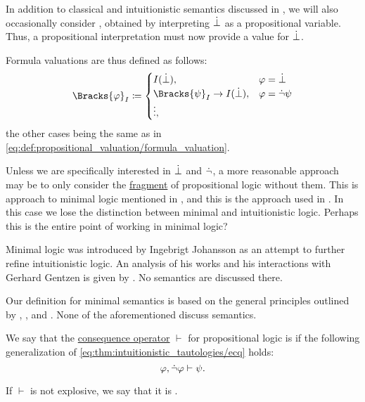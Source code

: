 \begin{definition}\label{def:minimal_propositional_semantics}\mimprovised
  In addition to classical and intuitionistic semantics discussed in , we will also occasionally consider , obtained by interpreting \( \dot\bot \) as a propositional variable. Thus, a propositional interpretation must now provide a value for \( \dot\bot \).

  Formula valuations are thus defined as follows:
  \begin{equation}\label{eq:def:minimal_propositional_semantics/formula_valuation}
    \Bracks{\varphi}_I \coloneqq \begin{cases}
      I(\synbot),                             &\varphi = \synbot \\
      \Bracks{\psi}_I \rightarrow I(\synbot), &\varphi = \synneg \psi \\
      \vdots, &
    \end{cases}
  \end{equation}
  the other cases being the same as in \eqref{eq:def:propositional_valuation/formula_valuation}.
\end{definition}
\begin{comments}
  \item Unless we are specifically interested in \( \dot\bot \) and \( \dot\neg \), a more reasonable approach may be to only consider the \hyperref[def:propositional_syntax/fragment]{fragment} of propositional logic without them. This is approach to minimal logic mentioned in , and this is the approach used in . In this case we lose the distinction between minimal and intuitionistic logic. Perhaps this is the entire point of working in minimal logic?
  \item Minimal logic was introduced by Ingebrigt Johansson as an attempt to further refine intuitionistic logic. An analysis of his works and his interactions with Gerhard Gentzen is given by . No semantics are discussed there.
  \item Our definition for minimal semantics is based on the general principles outlined by , ,  and . None of the aforementioned discuss semantics.
\end{comments}

\begin{definition}\label{def:paraconsistent_consequence_operator}
  We say that the \hyperref[def:consequence_operator]{consequence operator} \( \vdash \) for propositional logic is  if the following generalization of \eqref{eq:thm:intuitionistic_tautologies/ecq} holds:
  \begin{equation*}
    \varphi, \dot\neg \varphi \vdash \psi.
  \end{equation*}

  If \( \vdash \) is not explosive, we say that it is .
\end{definition}

